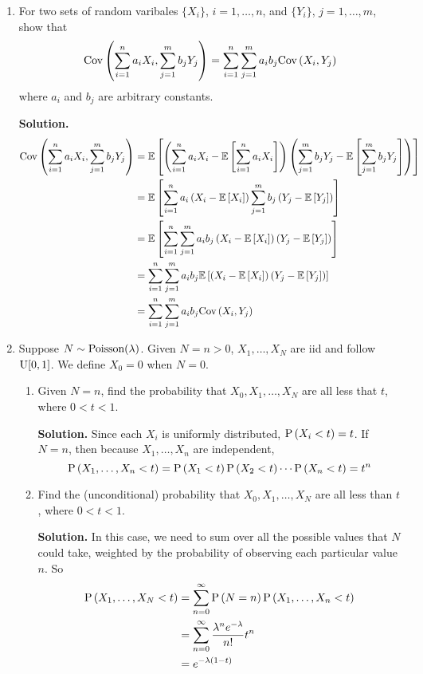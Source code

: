 \documentclass[titlepage]{article}
\begin{document}
\begin{enumerate}
\item For two sets of random varibales $\{X_i\}$, $i = 1, \ldots, n$, and $\{Y_i\}$, $j = 1, \ldots, m$, show that
\[\cov{\sum_{i=1}^n a_i X_i, \sum_{j=1}^m b_j Y_j} = \sum_{i=1}^n \sum_{j=1}^m a_i b_j \cov{X_i, Y_j}\]
where $a_i$ and $b_j$ are arbitrary constants.

\textbf{Solution.}
\[\begin{aligned}
\cov{\sum_{i=1}^n a_i X_i, \sum_{j=1}^m b_j Y_j} &= \ev{\left(\sum_{i=1}^n a_i X_i - \ev{\sum_{i=1}^n a_i X_i}\right) \left( \sum_{j=1}^m b_j Y_j - \ev{\sum_{j=1}^m b_j Y_j}\right)} \\
&= \ev{\sum_{i=1}^n a_i \left(X_i - \ev{X_i}\right)  \sum_{j=1}^m b_j \left(Y_j - \ev{Y_j}\right)} \\
&= \ev{\sum_{i=1}^n \sum_{j=1}^m a_i b_j \left(X_i - \ev{X_i}\right) \left(Y_j - \ev{Y_j}\right)} \\
&= \sum_{i=1}^n \sum_{j=1}^m a_i b_j \ev{\left(X_i - \ev{X_i}\right) \left(Y_j - \ev{Y_j}\right)} \\
&= \sum_{i=1}^n \sum_{j=1}^m a_i b_j \cov{X_i, Y_j} \\
\end{aligned}\]

\item Suppose $N \dist \pois(\lambda)$. Given $N = n > 0$, $X_1, \ldots, X_N$ are iid and follow $\U[0, 1]$. We define $X_0 = 0$ when $N = 0$.
  \begin{enumerate}
  \item Given $N = n$, find the probability that $X_0, X_1, \ldots, X_N$ are all less that $t$, where $0 < t < 1$.

  \textbf{Solution.} Since each $X_i$ is uniformly distributed, $\P{X_i < t} = t$. If $N = n$, then because $X_1, \ldots, X_n$ are independent,
  \[\P{X_1, \ldots, X_n < t} = \P{X_1 < t}\P{X_2 < t}\cdots\P{X_n < t} = t^n\]

  \item Find the (unconditional) probability that $X_0, X_1, \ldots, X_N$ are all less than $t$, where $0 < t < 1$.

  \textbf{Solution.} In this case, we need to sum over all the possible values that $N$ could take, weighted by the probability of observing each particular value $n$. So
  \[\begin{aligned}
  \P{X_1, \ldots, X_N < t} &= \sum_{n = 0}^\infty \P{N = n} \P{X_1, \ldots, X_n < t} \\
  &= \sum_{n = 0}^\infty \frac{\lambda^n e^{-\lambda}}{n!}t^n\\
  &= e^{-\lambda(1 - t)}
  \end{aligned}\]


\end{enumerate}
\end{enumerate}
\end{document}
